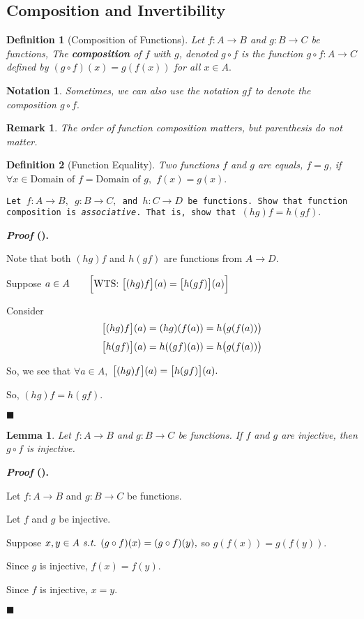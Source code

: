 \documentclass[12pt,a4paper]{article}
\newtheorem{nota}{Notation}[section]
\newtheorem{df}{Definition}[subsection]
\newtheorem{lem}{Lemma}[section]
\newcounter{nprf}[subsection]
\newtheorem*{rmk}{\indent Remark}
\newenvironment*{prf}{\par\indent\textbf{\textit{Proof} (\stepcounter{nprf}\thenprf). }\par }{\par\hfill $\blacksquare$\par}
\def\of{\circ}
\def\st{\emph{ s.t. }}
\begin{document}
\subsection{Composition and Invertibility}
\begin{df}[Composition of Functions]
	Let $f:A\to B$ and $g:B\to C$ be functions, The \textbf{composition} of $f$ with $g$, denoted $g\of f$ is the function $g\of f:A\to C$ defined by $(g\of f)(x)=g(f(x))$ for all $x\in A.$	
\end{df}
\begin{nota}
	Sometimes, we can also use the notation $gf$ to denote the composition $g\of f.$	
\end{nota}
\begin{rmk}
	The order of function composition matters, but parenthesis do not matter.	
\end{rmk}
\begin{df}[Function Equality]
	Two functions $f$ and $g$ are equals, $f=g$, if $\forall x\in\text{Domain of }f=\text{Domain of }g,$ $f(x)=g(x).$
\end{df}
\begin{framed}
\noindent\texttt{Let $f:A\to B,$ $g:B\to C,$ and $h:C\to D$ be functions. Show that function composition is \textit{associative}. That is, show that $(hg)f=h(gf).$}
\begin{prf}
	Note that both $(hg)f$ and $h(gf)$ are functions from $A\to D$.\par Suppose $a\in A\qquad\qty\Big[\text{WTS: }\qty\big[(hg)f](a)=\qty\big[h(gf)](a)]$\par Consider \[\qty\big[(hg)f](a)=(hg)(f(a))=h\qty\big(g(f(a)))\] \[\qty\big[h(gf)](a)=h\qty((gf)(a))=h\qty\big(g(f(a)))\]\par So, we see that $\forall a\in A,$ $\qty\big[(hg)f](a)=\qty\big[h(gf)](a).$\par So, $(hg)f=h(gf).$
\end{prf}
\end{framed}
\begin{framed}
\begin{lem}\label{lem3.3.1}
	Let $f:A\to B$ and $g: B\to C$ be functions. If $f$ and $g$ are injective, then $g\of f$ is injective. 
\end{lem}
\begin{prf}
	Let $f:A\to B$ and $g:B\to C$ be functions.\par Let $f$ and $g$ be injective.\par Suppose $x,y\in A\st (g\of f)(x)=(g\of f)(y),$ so $g(f(x))=g(f(y)).$\par Since $g$ is injective, $f(x)=f(y).$\par Since $f$ is injective, $x=y.$
\end{prf}
\end{framed}
\end{document}
